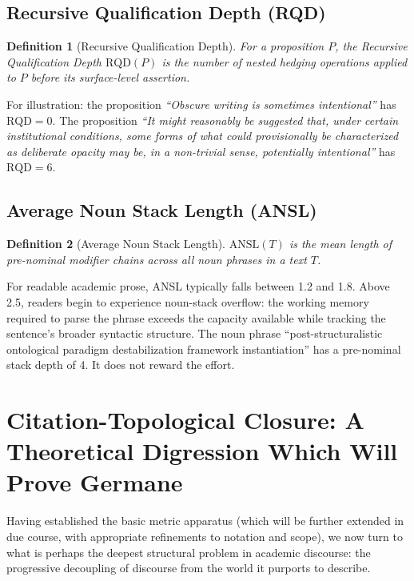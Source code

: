 \documentclass[12pt, a4paper]{article}
\newtheorem{definition}{Definition}
\begin{document}
\subsection{Recursive Qualification Depth (RQD)}

\begin{definition}[Recursive Qualification Depth]
For a proposition $P$, the Recursive Qualification Depth $\mathrm{RQD}(P)$ is the number of nested hedging operations applied to $P$ before its surface-level assertion.
\end{definition}

For illustration: the proposition \textit{``Obscure writing is sometimes intentional''} has $\mathrm{RQD} = 0$. The proposition \textit{``It might reasonably be suggested that, under certain institutional conditions, some forms of what could provisionally be characterized as deliberate opacity may be, in a non-trivial sense, potentially intentional''} has $\mathrm{RQD} = 6$.

\subsection{Average Noun Stack Length (ANSL)}

\begin{definition}[Average Noun Stack Length]
$\mathrm{ANSL}(T)$ is the mean length of pre-nominal modifier chains across all noun phrases in a text $T$.
\end{definition}

For readable academic prose, ANSL typically falls between 1.2 and 1.8. Above 2.5, readers begin to experience noun-stack overflow: the working memory required to parse the phrase exceeds the capacity available while tracking the sentence's broader syntactic structure. The noun phrase ``post-structuralistic ontological paradigm destabilization framework instantiation'' has a pre-nominal stack depth of 4. It does not reward the effort.


\section{Citation-Topological Closure: A Theoretical Digression Which Will Prove Germane}

Having established the basic metric apparatus (which will be further extended in due course, with appropriate refinements to notation and scope), we now turn to what is perhaps the deepest structural problem in academic discourse: the progressive decoupling of discourse from the world it purports to describe.
\end{document}
